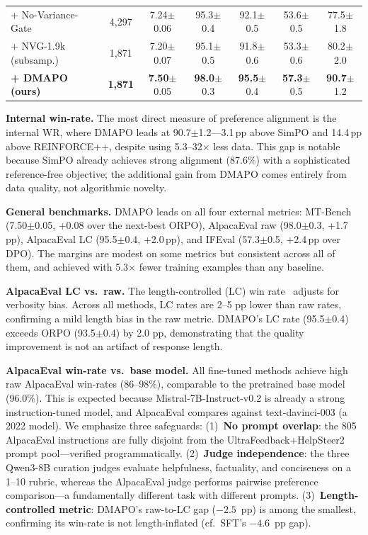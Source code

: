 \documentclass{article}
\newcommand{\method}{DMAPO}
\newcommand{\res}[2]{#1{\scriptsize$\pm$#2}}
\begin{document}
\begin{table}[t]
{\begin{tabular}{l c c cc c c}
+ No-Variance-Gate & 4,297 & \res{7.24}{0.06} & \res{95.3}{0.4} & \res{92.1}{0.5} & \res{53.6}{0.5} & \res{77.5}{1.8} \\
+ NVG-1.9k (subsamp.) & 1,871 & \res{7.20}{0.07} & \res{95.1}{0.5} & \res{91.8}{0.6} & \res{53.3}{0.6} & \res{80.2}{2.0} \\
\midrule
\textbf{+ DMAPO (ours)} & \textbf{1,871} & \res{\textbf{7.50}}{0.05} & \res{\textbf{98.0}}{0.3} & \res{\textbf{95.5}}{0.4} & \res{\textbf{57.3}}{0.5} & \res{\textbf{90.7}}{1.2} \\
\bottomrule
\end{tabular}%
}
\end{table}

\textbf{Internal win-rate.} The most direct measure of preference alignment is the internal WR, where \method{} leads at \res{90.7}{1.2}---3.1\,pp above SimPO and 14.4\,pp above REINFORCE++, despite using 5.3--32$\times$ less data. This gap is notable because SimPO already achieves strong alignment (87.6\%) with a sophisticated reference-free objective; the additional gain from \method{} comes entirely from data quality, not algorithmic novelty.

\textbf{General benchmarks.} \method{} leads on all four external metrics: MT-Bench (\res{7.50}{0.05}, +0.08 over the next-best ORPO), AlpacaEval raw (\res{98.0}{0.3}, +1.7\,pp), AlpacaEval LC (\res{95.5}{0.4}, +2.0\,pp), and IFEval (\res{57.3}{0.5}, +2.4\,pp over DPO). The margins are modest on some metrics but consistent across all of them, and achieved with 5.3$\times$ fewer training examples than any baseline.

\textbf{AlpacaEval LC vs.\ raw.} The length-controlled (LC) win rate~\citep{dubois2024lengthcontrolled} adjusts for verbosity bias. Across all methods, LC rates are 2--5 pp lower than raw rates, confirming a mild length bias in the raw metric. \method{}'s LC rate (\res{95.5}{0.4}) exceeds ORPO (\res{93.5}{0.4}) by 2.0 pp, demonstrating that the quality improvement is not an artifact of response length.

\textbf{AlpacaEval win-rate vs.\ base model.} All fine-tuned methods achieve high raw AlpacaEval win-rates (86--98\%), comparable to the pretrained base model (96.0\%). This is expected because Mistral-7B-Instruct-v0.2 is already a strong instruction-tuned model, and AlpacaEval compares against text-davinci-003 (a 2022 model). We emphasize three safeguards: (1)~\textbf{No prompt overlap}: the 805 AlpacaEval instructions are fully disjoint from the UltraFeedback+HelpSteer2 prompt pool---verified programmatically. (2)~\textbf{Judge independence}: the three Qwen3-8B curation judges evaluate helpfulness, factuality, and conciseness on a 1--10 rubric, whereas the AlpacaEval judge performs pairwise preference comparison---a fundamentally different task with different prompts. (3)~\textbf{Length-controlled metric}: \method{}'s raw-to-LC gap ($-2.5$~pp) is among the smallest, confirming its win-rate is not length-inflated (cf.\ SFT's $-4.6$~pp gap).
\end{document}
